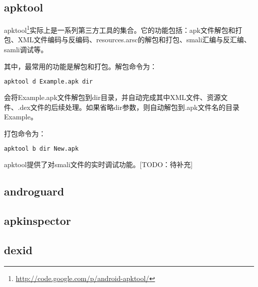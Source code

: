 \subsection{apktool}
apktool\footnote{\url{http://code.google.com/p/android-apktool/}}实际上是一系列第三方工具的集合。它的功能包括：apk文件解包和打包、XML文件编码与反编码、resources.arsc的解包和打包、smali汇编与反汇编、samli调试等。

其中，最常用的功能是解包和打包。解包命令为：
\begin{lstlisting}[language=bash, numbers=none]
apktool d Example.apk dir
\end{lstlisting}
会将Example.apk文件解包到dir目录，并自动完成其中XML文件、资源文件、.dex文件的后续处理。如果省略dir参数，则自动解包到.apk文件名的目录Example。

打包命令为：
\begin{lstlisting}[language=bash, numbers=none]
apktool b dir New.apk
\end{lstlisting}

apktool提供了对smali文件的实时调试功能。[TODO：待补充]
\subsection{androguard}
\subsection{apkinspector}
\subsection{dexid}
